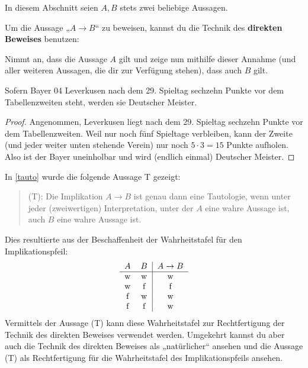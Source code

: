 In diesem Abschnitt seien $A,B$ stets zwei beliebige Aussagen.


\begin{axiom} \label{direkterbeweis} 
    Um die Aussage „$A\to B$“ zu beweisen, kannst du die Technik des \textbf{direkten Beweises} benutzen:
    
    Nimmt an, dass die Aussage $A$ gilt und zeige nun mithilfe dieser Annahme (und aller weiteren Aussagen, die dir zur Verfügung stehen), dass auch $B$ gilt.
\end{axiom}


\begin{bsp}
    Sofern Bayer 04 Leverkusen nach dem 29. Spieltag sechzehn Punkte vor dem Tabellenzweiten steht, werden sie Deutscher Meister.
\end{bsp}
\begin{proof}
    Angenommen, Leverkusen liegt nach dem 29. Spieltag sechzehn Punkte vor dem Tabellenzweiten. Weil nur noch fünf Spieltage verbleiben, kann der Zweite (und jeder weiter unten stehende Verein) nur noch $5\cdot 3=15$ Punkte aufholen. Also ist der Bayer uneinholbar und wird (endlich einmal) Deutscher Meister.
\end{proof}


\begin{bem}
    In \cref{tauto} wurde die folgende Aussage T gezeigt:
    \begin{quote}
        (T): Die Implikation $A\to B$ ist genau dann eine Tautologie, wenn unter jeder (zweiwertigen) Interpretation, unter der $A$ eine wahre Aussage ist, auch $B$ eine wahre Aussage ist.
    \end{quote}
    Dies resultierte aus der Beschaffenheit der Wahrheitstafel für den Implikationspfeil:
    \[\begin{tabular}{cc|c}
        $A$ & $B$ & $A\to B$ \\
        \hline
        w & w & w \\
        w & f & f \\
        f & w & w \\
        f & f & w
    \end{tabular}\]
    Vermittels der Aussage (T) kann diese Wahrheitstafel zur Rechtfertigung der Technik des direkten Beweises verwendet werden. Umgekehrt kannst du aber auch die Technik des direkten Beweises als „natürlicher“ ansehen und die Aussage (T) als Rechtfertigung für die Wahrheitstafel des Implikationspfeils ansehen.
\end{bem}
  
